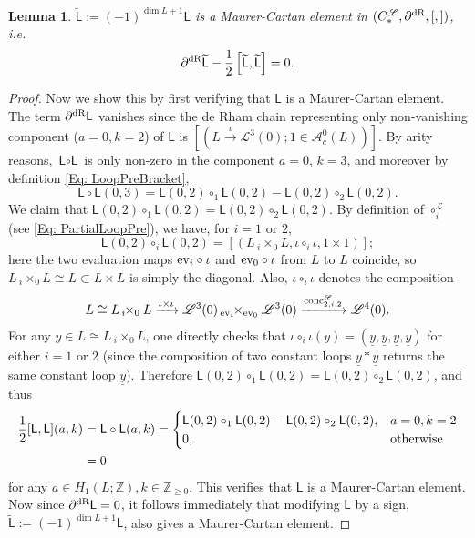 \documentclass[10pt]{amsart}
\numberwithin{equation}{section}
\theoremstyle{plain}
\newtheorem{lemma}[theorem]{Lemma}
\theoremstyle{definition}
\theoremstyle{remark}
\numberwithin{equation}{section}
\newcommand{\Z}{\mathbb{Z}}
\newcommand{\ev}{\textup{ev}}
\newcommand{\wt}[1]{\widetilde{#1}}
\newcommand{\dR}{\textup{dR}}
\newcommand{\fiberprod}[2]{\,_{#1}\!\!\times_{#2} }
\newcommand{\conc}{\textup{conc}^\mathscr{L}}
\newcommand{\CFr}{C_*^\mathscr{L}}
\newcommand{\LL}{\textsf{L}}
\begin{document}
{\begin{lemma}\label{Lm: E=0 MC elt}
	$\wt{\LL}:= (-1)^{\dim L + 1}\LL$ is a Maurer-Cartan element in $(\CFr, \partial^\dR, [,])$, i.e. 
\begin{align*}
	\partial^\dR \wt{\LL} - \frac{1}{2}\left[\wt{\LL},\wt{\LL}\right]  = 0.
\end{align*}
\end{lemma}
\begin{proof}
Now we show this by first verifying that $\LL$ is  a Maurer-Cartan element.
The term $\partial^\dR \LL$ vanishes since the de Rham chain representing only non-vanishing component ($a=0,k=2$) of $\LL$ is $[(L\xrightarrow{\iota} \mathscr{L}^3(0); 1\in \mathscr{A}^0_c(L))]$. By arity reasons, $\LL\circ \LL$ is only non-zero in the component $a=0$, $k=3$, and moreover by definition \eqref{Eq: LoopPreBracket}, \[ \LL \circ \LL (0,3) = \LL(0,2) \circ_1 \LL(0,2) - \LL(0,2)\circ_2 \LL(0,2). \]
We claim that $\LL(0,2)\circ_1\LL(0,2) = \LL(0,2)\circ_2\LL(0,2)$. 
By definition of $\circ_i^\mathscr{L}$ (see \eqref{Eq: PartialLoopPre}), we have, for $i=1$ or $2$,
\[
	\LL(0,2)\circ_i \LL(0,2) = [(L\fiberprod{i}{0} L, \iota\circ_i \iota, 1\times 1)];
\]
here the two evaluation maps $\ev_i\circ \iota$ and $\ev_0\circ \iota$ from $L$ to $L$ coincide, so $L\fiberprod{i}{0} L\cong L\subset L\times L$ is simply the diagonal. Also, $\iota\circ_i\iota$ denotes the composition
\[
	L\cong L\fiberprod{i}{0}L \xrightarrow{\iota\times \iota}\mathscr{L}^3(0)\fiberprod{\ev_i}{\ev_0} \mathscr{L}^3(0) \xrightarrow{\conc_{2,i,2}} \mathscr{L}^4(0).
\]
For any $y\in L\cong L\fiberprod{i}{0}L$, one directly checks that $\iota\circ_i\iota (y) = (\underline{y},\underline{y},\underline{y},\underline{y})$ for either $i=1$ or $2$ (since the composition of two constant loops $\underline{y} * \underline{y}$ returns the same constant loop $\underline{y}$).
Therefore $\LL(0,2)\circ_1\LL(0,2) = \LL(0,2)\circ_2 \LL(0,2)$, and thus
\begin{align*}
	\frac{1}{2} [\LL,\LL](a,k) &= \LL\circ \LL(a,k) =  \begin{cases}
		\LL(0,2)\circ_1 \LL(0,2) - \LL(0,2) \circ_2\LL(0,2), &  a= 0, k=2\\
		0, &\textup{otherwise}
	\end{cases}\\
	&= 0
\end{align*}
for any $a\in H_1(L;\Z), k\in \Z_{\geq 0}$. 
This verifies that $\LL$ is a Maurer-Cartan element.
Now since $\partial^\dR \LL=0$, it follows immediately that modifying $\LL$ by a sign, $\wt{\LL}:= (-1)^{\dim L + 1} \LL$, also gives a Maurer-Cartan element.
\end{proof}





}
\end{document}
